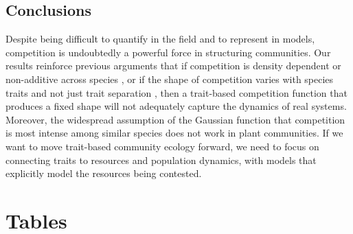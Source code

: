 \documentclass[a4paper,11pt]{article}
\begin{document}
\subsection{Conclusions}

Despite being difficult to quantify in the field and to represent in models, competition is undoubtedly a powerful force in structuring communities. Our results reinforce previous arguments that if competition is density dependent or non-additive across species \citep{Abrams-1980, Abrams-2008, Letten-2019}, or if the shape of competition varies with species traits and not just trait separation \citep{Abrams-2008, Song-2019}, then a trait-based competition function that produces a fixed shape will not adequately capture the dynamics of real systems. Moreover, the widespread assumption of the Gaussian function that competition is most intense among similar species does not work in plant communities. If we want to move trait-based community ecology forward, we need to focus on connecting traits to resources and population dynamics, with models that explicitly model the resources being contested.

\clearpage

\section{Tables}
\end{document}
